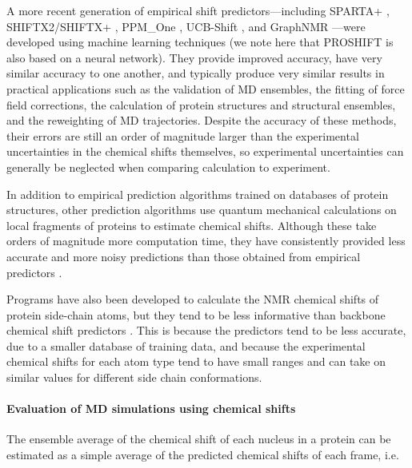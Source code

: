 \documentclass[9pt,review]{livecoms}
\begin{document}
A more recent generation of empirical shift predictors---including SPARTA+ \cite{shen_sparta_2010}, SHIFTX2/SHIFTX+ \cite{han_shiftx2_2011}, PPM\_One \cite{li_ppm_one_2015}, UCB-Shift \cite{li_accurate_2020}, and GraphNMR \cite{yang_predicting_2021}---were developed using machine learning techniques (we note here that PROSHIFT \cite{meiler_proshift_2003} is also based on a neural network).
They provide improved accuracy, have very similar accuracy to one another, and typically produce very similar results in practical applications such as the validation of MD ensembles, the fitting of force field corrections, the calculation of protein structures and structural ensembles, and the reweighting of MD trajectories.
Despite the accuracy of these methods, their errors are still an order of magnitude larger than the experimental uncertainties in the chemical shifts themselves, so experimental uncertainties can generally be neglected when comparing calculation to experiment.

In addition to empirical prediction algorithms trained on databases of protein structures, other prediction algorithms use quantum mechanical calculations on local fragments of proteins to estimate chemical shifts.
Although these take orders of magnitude more computation time, they have consistently provided less accurate and more noisy predictions than those obtained from empirical predictors \cite{mulder_nmr_2010,frank_toward_2012,sumowski_sensitivity_2014,fritz_determination_2018,case_using_2020,chandy_accurate_2020}.

Programs have also been developed to calculate the NMR chemical shifts of protein side-chain atoms, but they tend to be less informative than backbone chemical shift predictors \cite{han_shiftx2_2011,sahakyan_structure-based_2011,sahakyan_using_2011,li_ppm_one_2015}.
This is because the predictors tend to be less accurate, due to a smaller database of training data, and because the experimental chemical shifts for each atom type tend to have small ranges and can take on similar values for different side chain conformations.

\paragraph{Evaluation of MD simulations using chemical shifts}

The ensemble average of the chemical shift of each nucleus in a protein can be estimated as a simple average of the predicted chemical shifts of each frame, i.e. 
\end{document}
